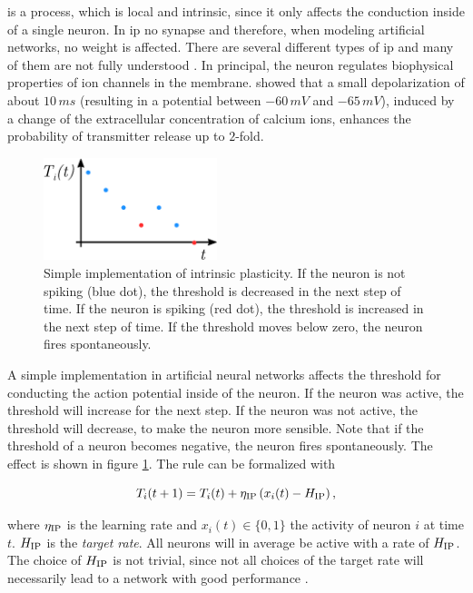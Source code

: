 is a process, which is local and intrinsic, since it only affects the conduction inside of a single neuron. In \acs{ip} no synapse and therefore, when modeling artificial networks, no weight is affected. There are several different types of \acl{ip} and many of them are not fully understood \parencite{cudmore2008intrinsic}. In principal, the neuron regulates biophysical properties of ion channels in the membrane. \textcite{awatramani2005modulation} showed that a small depolarization of about $10\,ms$ (resulting in a potential between $-60\,mV$ and $-65\,mV$), induced by a change of the extracellular concentration of calcium ions, enhances the probability of transmitter release up to $2$-fold.

\begin{figure}
	\centering
	\includegraphics[width=0.45\textwidth]{neurons_plasticity/ip}
    \caption[Intrinsic plasticity and spontaneous activity]{Simple implementation of intrinsic plasticity. If the neuron is not spiking (blue dot), the threshold is decreased in the next step of time. If the neuron is spiking (red dot), the threshold is increased in the next step of time. If the threshold moves below zero, the neuron fires spontaneously.}
    \vspace{10pt}
    \label{fig:intrinsic-plasticity}
\end{figure}

A simple implementation in artificial neural networks affects the threshold for conducting the action potential inside of the neuron. If the neuron was active, the threshold will increase for the next step. If the neuron was not active, the threshold will decrease, to make the neuron more sensible. Note that if the threshold of a neuron becomes negative, the neuron fires spontaneously. The effect is shown in figure \ref{fig:intrinsic-plasticity}. The rule can be formalized with

\begin{equation}
\label{eq:ip}
T_i(t+1) = T_i(t) + \eta_{\text{IP}} \left( x_i(t) - H_{\text{IP}} \right),
\end{equation}


where $\eta_{\text{IP}}$ is the learning rate and $x_i(t) \in \{0,1\}$ the activity of neuron $i$ at time $t$. $H_{\text{IP}}$ is the \emph{target rate}. All neurons will in average be active with a rate of $H_{\text{IP}}$. The choice of $H_{\text{IP}}$ is not trivial, since not all choices of the target rate will necessarily lead to a network with good performance \parencite{lazar2009sorn}.
